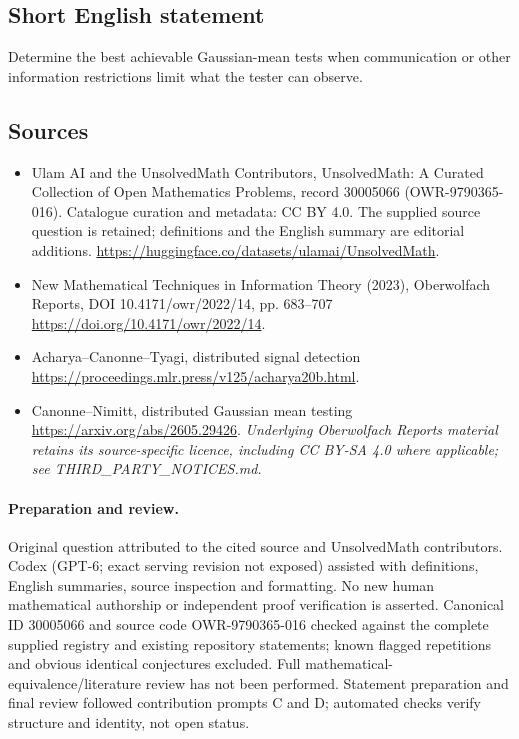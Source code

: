 \documentclass[11pt]{article}
\begin{document}
\subsection{Short English statement}
Determine the best achievable Gaussian-mean tests when communication or other information restrictions limit what the tester can observe.
\subsection{Sources}
\begin{itemize}
\item[\hypertarget{source:30005066:1}{S1}] Ulam AI and the UnsolvedMath Contributors, UnsolvedMath: A Curated Collection of Open Mathematics Problems, record 30005066 (OWR-9790365-016). Catalogue curation and metadata: CC BY 4.0. The supplied source question is retained; definitions and the English summary are editorial additions.
\url{https://huggingface.co/datasets/ulamai/UnsolvedMath}.
\item[\hypertarget{source:30005066:2}{S2}] New Mathematical Techniques in Information Theory (2023), Oberwolfach Reports, DOI 10.4171/owr/2022/14, pp. 683--707
\url{https://doi.org/10.4171/owr/2022/14}.
\item[\hypertarget{source:30005066:3}{S3}] Acharya--Canonne--Tyagi, distributed signal detection
\url{https://proceedings.mlr.press/v125/acharya20b.html}.
\item[\hypertarget{source:30005066:4}{S4}] Canonne--Nimitt, distributed Gaussian mean testing
\url{https://arxiv.org/abs/2605.29426}.
\textit{Underlying Oberwolfach Reports material retains its source-specific licence, including CC BY-SA 4.0 where applicable; see THIRD\_PARTY\_NOTICES.md.}
\end{itemize}
\paragraph{Preparation and review.}
Original question attributed to the cited source and UnsolvedMath contributors. Codex (GPT-6; exact serving revision not exposed) assisted with definitions, English summaries, source inspection and formatting. No new human mathematical authorship or independent proof verification is asserted. Canonical ID 30005066 and source code OWR-9790365-016 checked against the complete supplied registry and existing repository statements; known flagged repetitions and obvious identical conjectures excluded. Full mathematical-equivalence/literature review has not been performed. Statement preparation and final review followed contribution prompts C and D; automated checks verify structure and identity, not open status.
\label{end:30005066}
\end{document}
